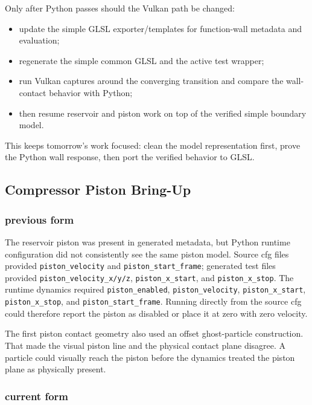 Only after Python passes should the Vulkan path be changed:
\begin{itemize}
    \item update the simple GLSL exporter/templates for function-wall metadata
          and evaluation;
    \item regenerate the simple common GLSL and the active test wrapper;
    \item run Vulkan captures around the converging transition and compare the
          wall-contact behavior with Python;
    \item then resume reservoir and piston work on top of the verified simple
          boundary model.
\end{itemize}

This keeps tomorrow's work focused: clean the model representation first,
prove the Python wall response, then port the verified behavior to GLSL.

\subsection{Compressor Piston Bring-Up}

\subsubsection{previous form}

The reservoir piston was present in generated metadata, but Python runtime
configuration did not consistently see the same piston model.  Source cfg
files provided \texttt{piston\_velocity} and
\texttt{piston\_start\_frame}; generated test files provided
\texttt{piston\_velocity\_x/y/z}, \texttt{piston\_x\_start}, and
\texttt{piston\_x\_stop}.  The runtime dynamics required
\texttt{piston\_enabled}, \texttt{piston\_velocity},
\texttt{piston\_x\_start}, \texttt{piston\_x\_stop}, and
\texttt{piston\_start\_frame}.  Running directly from the source cfg could
therefore report the piston as disabled or place it at zero with zero
velocity.

The first piston contact geometry also used an offset ghost-particle
construction.  That made the visual piston line and the physical contact
plane disagree.  A particle could visually reach the piston before the
dynamics treated the piston plane as physically present.

\subsubsection{current form}

